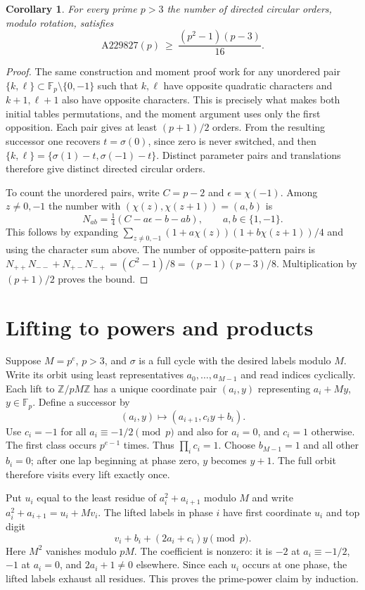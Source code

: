 \documentclass[11pt]{article}
\newtheorem{corollary}[theorem]{Corollary}
\newcommand{\F}{\mathbb F}
\begin{document}
\begin{corollary}\label{cor:count}
For every prime $p>3$ the number of directed circular orders, modulo rotation, satisfies
\[
    \mathrm{A229827}(p)\ \ge\ \frac{(p^2-1)(p-3)}{16}.
\]
\end{corollary}
\begin{proof}
The same construction and moment proof work for any unordered pair
$\{k,\ell\}\subset\F_p\setminus\{0,-1\}$ such that $k,\ell$ have opposite quadratic characters and $k+1,\ell+1$ also have opposite characters. This is precisely what makes both initial tables permutations, and the moment argument uses only the first opposition. Each pair gives at least $(p+1)/2$ orders. From the resulting successor one recovers $t=\sigma(0)$, since zero is never switched, and then $\{k,\ell\}=\{\sigma(1)-t,\sigma(-1)-t\}$. Distinct parameter pairs and translations therefore give distinct directed circular orders.

To count the unordered pairs, write $C=p-2$ and $\epsilon=\chi(-1)$. Among $z\ne0,-1$ the number with $(\chi(z),\chi(z+1))=(a,b)$ is
\[
     N_{ab}=\tfrac14(C-a\epsilon-b-ab),\qquad a,b\in\{1,-1\}.
\]
This follows by expanding $\sum_{z\ne0,-1}(1+a\chi(z))(1+b\chi(z+1))/4$ and using the character sum above. The number of opposite-pattern pairs is
$N_{++}N_{--}+N_{+-}N_{-+}=(C^2-1)/8=(p-1)(p-3)/8$. Multiplication by $(p+1)/2$ proves the bound.
\end{proof}

\section{Lifting to powers and products}
Suppose $M=p^e$, $p>3$, and $\sigma$ is a full cycle with the desired labels modulo $M$. Write its orbit using least representatives $a_0,\ldots,a_{M-1}$ and read indices cyclically. Each lift to $\mathbb Z/pM\mathbb Z$ has a unique coordinate pair $(a_i,y)$ representing $a_i+My$, $y\in\F_p$. Define a successor by
\[
  (a_i,y)\longmapsto (a_{i+1},c_i y+b_i).
\]
Use $c_i=-1$ for all $a_i\equiv-1/2\pmod p$ and also for $a_i=0$, and $c_i=1$ otherwise. The first class occurs $p^{e-1}$ times. Thus $\prod_i c_i=1$. Choose $b_{M-1}=1$ and all other $b_i=0$; after one lap beginning at phase zero, $y$ becomes $y+1$. The full orbit therefore visits every lift exactly once.

Put $u_i$ equal to the least residue of $a_i^2+a_{i+1}$ modulo $M$ and write $a_i^2+a_{i+1}=u_i+M v_i$. The lifted labels in phase $i$ have first coordinate $u_i$ and top digit
\[
 v_i+b_i+(2a_i+c_i)y\pmod p.
\]
Here $M^2$ vanishes modulo $pM$. The coefficient is nonzero: it is $-2$ at $a_i\equiv-1/2$, $-1$ at $a_i=0$, and $2a_i+1\ne0$ elsewhere. Since each $u_i$ occurs at one phase, the lifted labels exhaust all residues. This proves the prime-power claim by induction.
\end{document}
